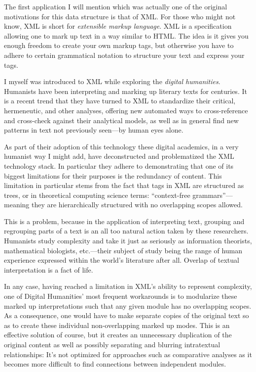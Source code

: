\documentclass[twoside]{article}
\begin{document}
The first application I will mention which was actually one of the original motivations for this data structure
is that of XML. For those who might not know, XML is short for \emph{extensible markup language}. XML is a
specification allowing one to mark up text in a way similar to HTML. The idea is it gives you enough freedom
to create your own markup tags, but otherwise you have to adhere to certain grammatical notation to structure
your text and express your tags.

I myself was introduced to XML while exploring the \emph{digital humanities}. Humanists have been interpreting
and marking up literary texts for centuries. It is a recent trend that they have turned to XML to standardize their
critical, hermeneutic, and other analyses, offering new automated ways to cross-reference and cross-check against
their analytical models, as well as in general find new patterns in text not previously seen---by human eyes alone.

As part of their adoption of this technology these digital academics, in a very humanist way I might add,
have deconstructed and problematized the XML technology stack. In particular they adhere to demonstrating
that one of its biggest limitations for their purposes is the redundancy of content. This limitation in
particular stems from the fact that tags in XML are structured as trees, or in theoretical computing science
terms: ``context-free grammars''---meaning they are hierarchically structured with no overlapping scopes allowed.

This is a problem, because in the application of interpreting text, grouping and regrouping parts of a text
is an all too natural action taken by these researchers. Humanists study complexity and take it just as seriously
as information theorists, mathematical biologists, etc.---their subject of study being the range of human experience
expressed within the world's literature after all. Overlap of textual interpretation is a fact of life.

In any case, having reached a limitation in XML's ability to represent complexity, one of Digital Humanities'
most frequent workarounds is to modularize these marked up interpretations such that any given module has
no overlapping scopes. As a consequence, one would have to make separate copies of the original text so as
to create these individual non-overlapping marked up modes. This is an effective solution of course,
but it creates an unnecessary duplication of the original content as well as possibly separating and blurring
intratextual relationships: It's not optimized for approaches such as comparative analyses as it becomes more
difficult to find connections between independent modules.
\end{document}
